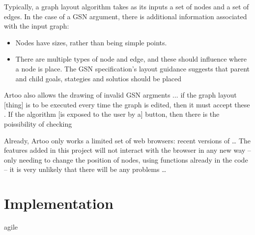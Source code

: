 Typically, a graph layout algorithm takes as its inputs a set of nodes and a set of edges.
In the case of a GSN argument, there is additional information associated with the input graph:

\begin{itemize}
  \item
    Nodes have sizes, rather than being simple points. 
  \item
    There are multiple types of node and edge, and these should influence where a node is place. The GSN specification's layout guidance suggests that parent and child goals, stategies and solutios should be placed 
\end{itemize}

Artoo also allows the drawing of invalid GSN argments ...
if the graph layout [thing] is to be executed every time the graph is edited, then it must accept these .
If the algorithm [is exposed to the user by a] button, then there is the poissibility of checking 

Already, Artoo only works a limited set of web browsers: recent versions of \ldots
The features added in this project will not interact with the browser in any new way -- only needing to change the position of nodes, using functions already in the code -- it is very unlikely that there will be any problems \ldots






\chapter{Implementation}

agile


